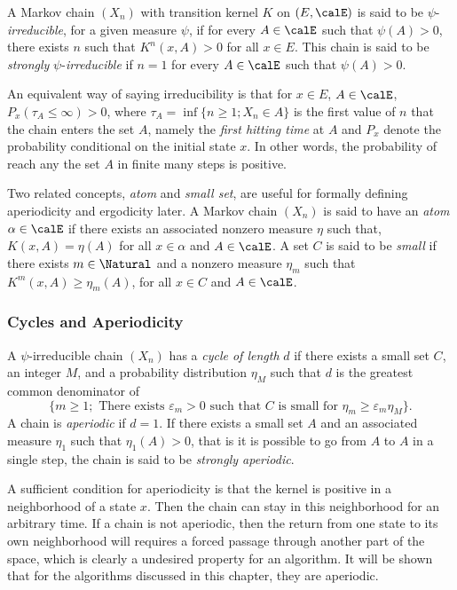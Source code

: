A Markov chain $(X_n)$ with transition kernel $K$ on $(E,\calE)$ is said to be
$\psi$-\emph{irreducible}, for a given measure $\psi$, if for every
$A\in\calE$ such that $\psi(A)>0$, there exists $n$ such that $K^n(x,A)>0$ for
all $x\in E$. This chain is said to be \emph{strongly}
$\psi$-\emph{irreducible} if $n=1$ for every $A\in\calE$ such that
$\psi(A)>0$.

An equivalent way of saying irreducibility is that for $x\in E$, $A\in\calE$,
$P_x(\tau_A\le\infty) > 0$, where $\tau_A = \inf\{n\ge1;X_n\in A\}$ is the
first value of $n$ that the chain enters the set $A$, namely the \emph{first
  hitting time} at $A$ and $P_x$ denote the probability conditional on the
initial state $x$. In other words, the probability of reach any the set $A$ in
finite many steps is positive.

Two related concepts, \emph{atom} and \emph{small set}, are useful for
formally defining aperiodicity and ergodicity later. A Markov chain $(X_n)$ is
said to have an \emph{atom} $\alpha\in\calE$ if there exists an associated
nonzero measure $\eta$ such that, $K(x,A) = \eta(A)$ for all $x\in\alpha$ and
$A\in\calE$. A set $C$ is said to be \emph{small} if there exists
$m\in\Natural$ and a nonzero measure $\eta_m$ such that
$K^m(x,A)\ge\eta_m(A)$, for all $x\in C$ and $A\in\calE$.

\subsubsection{Cycles and Aperiodicity}
\label{ssub:Cycles and Aperiodicity}

A $\psi$-irreducible chain $(X_n)$ has a \emph{cycle of length} $d$ if there
exists a small set $C$, an integer $M$, and a probability distribution
$\eta_M$ such that $d$ is the greatest common denominator of
\begin{equation*}
  \{m\ge1;\text{ There exists }\varepsilon_m > 0\text{ such that }C\text{ is
    small for }\eta_m\ge\varepsilon_m\eta_M\}.
\end{equation*}
A chain is \emph{aperiodic} if $d = 1$. If there exists a small set $A$ and an
associated measure $\eta_1$ such that $\eta_1(A) > 0$, that is it is possible
to go from $A$ to $A$ in a single step, the chain is said to be
\emph{strongly aperiodic}.

A sufficient condition for aperiodicity is that the kernel is positive in a
neighborhood of a state $x$. Then the chain can stay in this neighborhood for
an arbitrary time. If a chain is not aperiodic, then the return from one state
to its own neighborhood will requires a forced passage through another part of
the space, which is clearly a undesired property for an \mcmc algorithm. It
will be shown that for the algorithms discussed in this chapter, they are
aperiodic.

